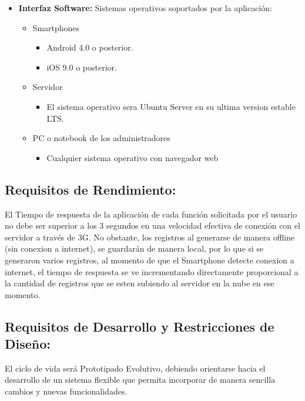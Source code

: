 \begin{itemize}
        \item \textbf{Interfaz Software:} 
          Sistemas operativos soportados por la aplicación:
          \begin{itemize}
            \item Smartphones 
            \begin{itemize}
              \item Android 4.0 o posterior.
              \item iOS 9.0 o posterior.
            \end{itemize}
            \item Servidor 
            \begin{itemize}
              \item  El sistema operativo sera Ubuntu Server en su ultima version estable LTS. 
            \end{itemize}
            \item PC o notebook de los administradores 
            \begin{itemize}
              \item Cualquier sistema operativo con navegador web 
            \end{itemize} 
          \end{itemize}
      \end{itemize}

    \subsection{Requisitos de Rendimiento:}

      El Tiempo de respuesta de la aplicación de cada función solicitada por el usuario no debe ser superior a los 3 segundos en una velocidad efectiva de conexión con el servidor a través de 3G.
      No obstante, los registros al generarse de manera offline (sin conexion a internet), se guardarán de manera local, por lo que si se generaron varios registros, al momento de que el Smartphone detecte conexion a internet, el tiempo de respuesta se ve incrementando directamente proporcional a la cantidad de registros que se esten subiendo al servidor en la nube en ese momento.

    \subsection{Requisitos de Desarrollo y Restricciones de Diseño:}

      El ciclo de vida será Prototipado Evolutivo, debiendo orientarse hacia el desarrollo de un sistema flexible que permita incorporar de manera sencilla cambios y nuevas funcionalidades.

